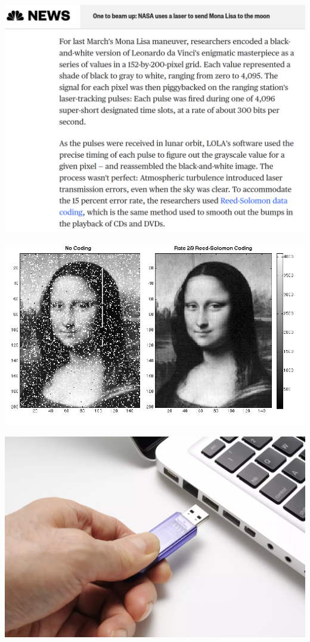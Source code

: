 \documentclass[11pt]{article}
\begin{document}
\begin{center}
\includegraphics[width=.9\linewidth]{news.png}
\end{center}

\begin{center}
\includegraphics[width=.9\linewidth]{monalisa.jpg}
\end{center}

\begin{center}
\includegraphics[width=.9\linewidth]{flashdrive.png}
\end{center}
\end{document}

